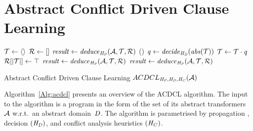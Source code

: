 \section{Abstract Conflict Driven Clause Learning}
%
\begin{algorithm2e}[t]
\DontPrintSemicolon
{}
\begin{small}
$\mathcal{T} \leftarrow \langle\rangle$ \;
$\mathcal{R} \leftarrow []$ \;
$\mathit{result} \leftarrow \mathit{deduce}_{\mathit{H_P}}(\mathcal{A},\mathcal{T},\mathcal{R})$ \;
 {
  \return \safe}
{
 {
  \return (\unsafe)}
  $\mathit{q} \leftarrow \mathit{decide}_{\mathit{H_D}}(\mathit{abs}(\mathcal{T}))$ \;
  $\mathcal{T} \leftarrow \mathcal{T} \cdot \mathit{q}$ \; 
  $\mathcal{R}[|\mathcal{T}|] \leftarrow \top$ \;
  $\mathit{result} \leftarrow \mathit{deduce}_{\mathit{H_P}}(\mathcal{A},\mathcal{T},\mathcal{R})$\;
   {
    \lIf{$\neg \analyzeconflict_{\confheur}(\abstransset,\trail,\reasons)$} {
      \return \safe
    }
    $\mathit{result} \leftarrow \mathit{deduce}_{\mathit{H_P}}(\mathcal{A},\mathcal{T},\mathcal{R})$ \;
  }
}
\end{small}
\caption{Abstract Conflict Driven Clause Learning $ACDCL_{\mathit{H_P},\mathit{H_D},\mathit{H_C}}(\mathcal{A})$ \label{Alg:acdcl}}
\end{algorithm2e}
%
Algorithm~\ref{Alg:acdcl} presents an overview of the ACDCL algorithm.
The input to the algorithm is a program in the form of the set of its 
abstract transformers $\mathcal{A}$ w.r.t.\ an abstract domain~$\mathit{D}$.  
The algorithm is parametrised by propagation \rmcmt{$(\propheur)$}, decision
$(\mathit{H_D})$, and conflict analysis heuristics $(\mathit{H_C})$.  
